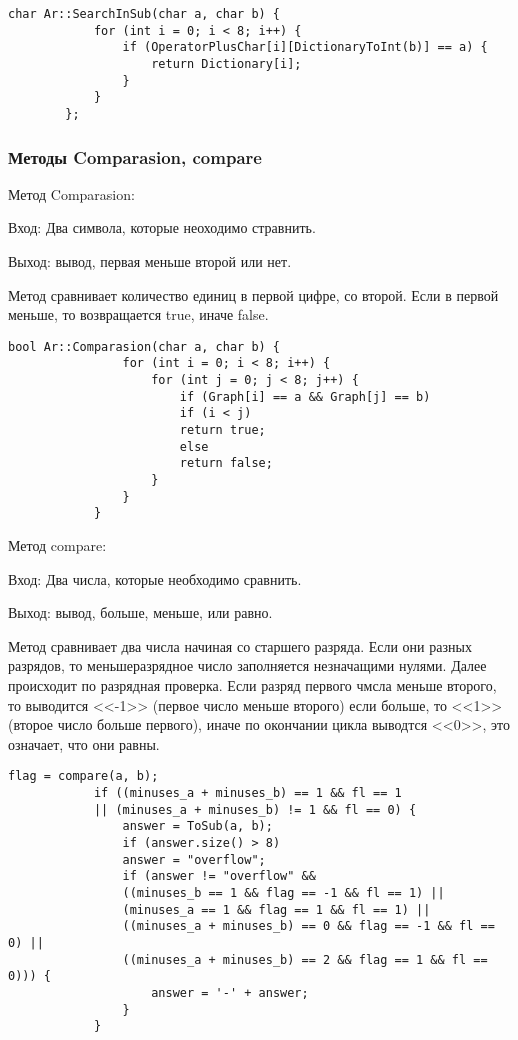 \documentclass[10pt,a4paper,final]{article} %
\begin{document}
		\begin{lstlisting}[caption={Метод SearchInSub}]
		char Ar::SearchInSub(char a, char b) {	
			for (int i = 0; i < 8; i++) {
				if (OperatorPlusChar[i][DictionaryToInt(b)] == a) {
					return Dictionary[i];
				}
			}
		};
		\end{lstlisting}
		
		
		
			\subsubsection{Методы Comparasion, compare}
	
		Метод Comparasion:
		
		Вход: Два символа, которые неоходимо стравнить.
		
		Выход: вывод, первая меньше второй или нет.
		
		Метод сравнивает количество единиц в первой цифре, со второй. Если в первой меньше, то возвращается true, иначе false.
		\begin{lstlisting}[caption={Метод Comparasion}]
			bool Ar::Comparasion(char a, char b) {
				for (int i = 0; i < 8; i++) {
					for (int j = 0; j < 8; j++) {
						if (Graph[i] == a && Graph[j] == b)
						if (i < j)
						return true;
						else
						return false;
					}
				}
			}
		\end{lstlisting}
		
				Метод compare:
					
					Вход: Два числа, которые необходимо сравнить.
				
				Выход: вывод, больше, меньше, или равно.
				
				Метод сравнивает два числа начиная со старшего разряда. Если они разных разрядов, то меньшеразрядное число заполняется незначащими нулями. Далее происходит по разрядная проверка. Если разряд первого чмсла меньше второго, то выводится <<-1>> (первое число меньше второго) если больше, то <<1>>(второе число больше первого), иначе по окончании цикла выводтся <<0>>, это означает, что они равны. 
		
		\begin{lstlisting}[caption={Метод compare}]
			flag = compare(a, b);
			if ((minuses_a + minuses_b) == 1 && fl == 1
			|| (minuses_a + minuses_b) != 1 && fl == 0) {
				answer = ToSub(a, b);
				if (answer.size() > 8)
				answer = "overflow";
				if (answer != "overflow" &&
				((minuses_b == 1 && flag == -1 && fl == 1) ||
				(minuses_a == 1 && flag == 1 && fl == 1) ||
				((minuses_a + minuses_b) == 0 && flag == -1 && fl == 0) ||
				((minuses_a + minuses_b) == 2 && flag == 1 && fl == 0))) {
					answer = '-' + answer;
				}
			}
		\end{lstlisting}
		
\end{document}
